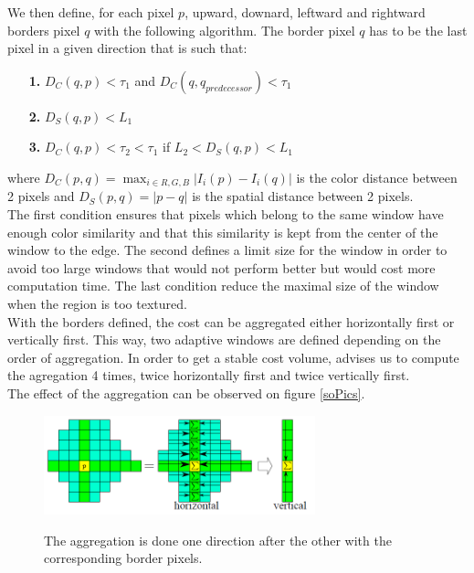 \documentclass{ipol}
\begin{document}
We then define, for each pixel $p$, upward, downard, leftward and rightward borders pixel $q$ with the following algorithm. The border pixel $q$ has to be the last pixel in a given direction that is such that:
\begin{itemize}
	\item[\textbf{1. }]$D_C(q, p) < \tau_1$ and $D_C(q, q_{predecessor}) < \tau_1$
	\item[\textbf{2. }]$D_S(q, p) < L_1$
	\item[\textbf{3. }]$D_C(q, p) < \tau_2 < \tau_1$ if $L_2 <  D_S(q, p) < L_1$
\end{itemize}
where $D_C(p, q) = \max_{i \in R, G, B} |I_i(p) - I_i(q)|$ is the color distance between 2 pixels and  $D_S(p, q) = |p - q|$ is the spatial distance between 2 pixels.\\
The first condition ensures that pixels which belong to the same window have enough color similarity and that this similarity is kept from the center of the window to the edge. The second defines a limit size for the window in order to avoid too large windows that would not perform better but would cost more computation time. The last condition reduce the maximal size of the window when the region is too textured.\\
With the borders defined, the cost can be aggregated either horizontally first or vertically first. This way, two adaptive windows are defined depending on the order of aggregation. In order to get a stable cost volume, \cite{adCensus} advises us to compute the agregation 4 times, twice horizontally first and twice vertically first.\\
The effect of the aggregation can be observed on figure \ref{soPics}.

\begin{figure}[h]
\begin{center}	
\includegraphics[width=0.7\textwidth]{Images/cost_aggregation.png}
	\label{cost_aggregation}
	\caption{The aggregation is done one direction after the other with the corresponding border pixels.}
\end{center}
\end{figure}
\end{document}

